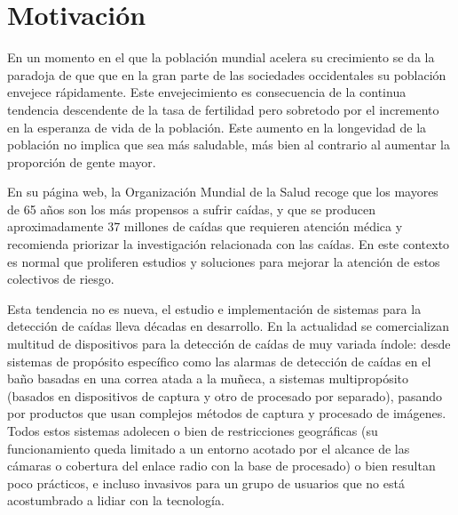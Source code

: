 \begin{comment}
Resumen esquemático de cada una de las partes del trabajo. Leer esta sección ha de dar una idea clara de lo que se pretendía y las conclusiones a las que se han llegado y del proceso seguido. Es uno de los capítulos mas importantes

Motivación: 
Problema a tratar, posibles causas, relevancia del problema

Planteamiento:
¿cómo se puede resolver el problema qué se propone descripción de objetivos en términos generales?

Estructura:
qué hay en cada uno de los subsiguientes capítulos
\end{comment}

\section{Motivación}\label{sec:intro:motivación}

En un momento en el que la población mundial acelera su crecimiento se da la paradoja de que que en la gran parte de las sociedades occidentales su población envejece rápidamente. Este envejecimiento es consecuencia de la continua tendencia descendente de la tasa de fertilidad pero sobretodo por el incremento en la esperanza de vida de la población. Este aumento en la longevidad de la población no implica que sea más saludable, más bien al contrario al aumentar la proporción de gente mayor.

En su página web, la Organización Mundial de la Salud recoge que los mayores de 65 años son los más propensos a sufrir caídas, y que se producen aproximadamente 37 millones de caídas que requieren atención médica y recomienda priorizar la investigación relacionada con las caídas\cite{FactsFalls2018}. En este contexto es normal que proliferen estudios y soluciones para mejorar la atención de estos colectivos de riesgo.

Esta tendencia no es nueva, el estudio e implementación de sistemas para la detección de caídas lleva décadas en desarrollo\cite{fallindex00, Chen2005, Noury2007, Bourke2006}. En la actualidad se comercializan multitud de dispositivos para la detección de caídas de muy variada índole: desde sistemas de propósito específico como las alarmas de detección de caídas en el baño basadas en una correa atada a la muñeca, a sistemas multipropósito (basados en dispositivos de captura y otro de procesado por separado), pasando por productos que usan complejos métodos de captura y procesado de imágenes. Todos estos sistemas adolecen o bien de restricciones geográficas (su funcionamiento queda limitado a un entorno acotado por el alcance de las cámaras o cobertura del enlace radio con la base de procesado) o bien resultan poco prácticos, e incluso invasivos para un grupo de usuarios que no está acostumbrado a lidiar con la tecnología.

